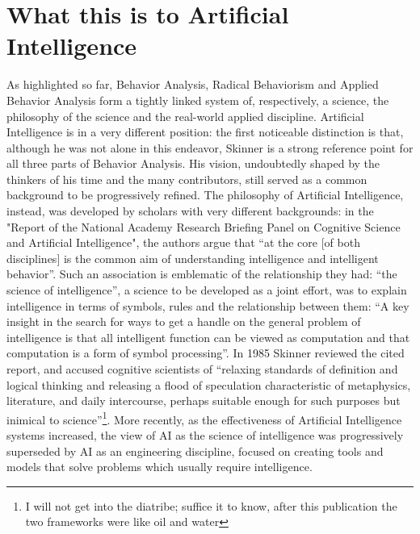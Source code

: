 \documentclass[letterpaper,11pt,twocolumn]{article}
\begin{document}
\section*{What this is to Artificial Intelligence}
As highlighted so far, Behavior Analysis, Radical Behaviorism and Applied Behavior Analysis form a tightly linked system of, respectively, a science, the philosophy of the science and the real-world applied discipline. Artificial Intelligence is in a very different position: the first noticeable distinction is that, although he was not alone in this endeavor, Skinner is a strong reference point for all three parts of Behavior Analysis. His vision, undoubtedly shaped by the thinkers of his time and the many contributors, still served as a common background to be progressively refined. The philosophy of Artificial Intelligence, instead, was developed by scholars with very different backgrounds: in the "Report of the National Academy Research Briefing Panel on Cognitive Science and Artificial Intelligence"\cite{estesReportNationalAcademy1983}, the authors argue that \enquote{at the core [of both disciplines] is the common aim of understanding intelligence and intelligent behavior}. Such an association is emblematic of the relationship they had: \enquote{the science of intelligence}, a science to be developed as a joint effort, was to explain intelligence in terms of symbols, rules and the relationship between them: \enquote{A key insight in the search for ways to get a handle on the general problem of intelligence is that all intelligent function can be viewed as computation and that computation is a form of symbol processing}. In 1985 Skinner reviewed the cited report, and accused cognitive scientists of \enquote{relaxing standards of definition and logical thinking and releasing a flood of speculation characteristic of metaphysics, literature, and daily intercourse, perhaps suitable enough for such purposes but inimical to science}\footnote{I will not get into the diatribe; suffice it to know, after this publication the two frameworks were like oil and water}. More recently, as the effectiveness of Artificial Intelligence systems increased, the view of AI as the science of intelligence was progressively superseded by AI as an engineering discipline, focused on creating tools and models that solve problems which usually require intelligence.
\end{document}
